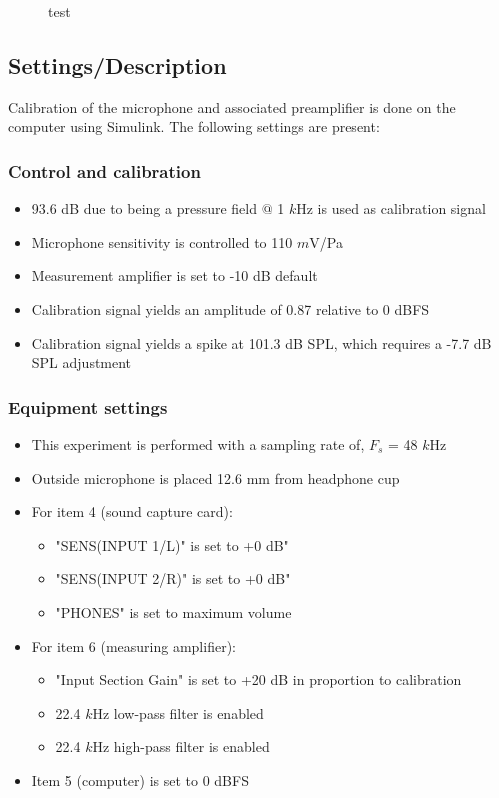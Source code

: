 \begin{figure}[H]
	\centering
	
	\caption{test}
	\label{test}
\end{figure}

\subsection{Settings/Description}
\label{SettingsHeadPhones}
Calibration of the microphone and associated preamplifier is done on the computer using Simulink\textsuperscript{\textregistered}. The following settings are present:

\subsubsection{Control and calibration}
\begin{itemize}

	\item 93.6 dB due to being a pressure field $@$ 1 $k$Hz is used as calibration signal
	\item Microphone sensitivity is controlled to 110 $m$V/Pa
	\item Measurement amplifier is set to -10 dB default
	\item Calibration signal yields an amplitude of 0.87 relative to 0 dBFS
	\item  Calibration signal yields a spike at 101.3 dB SPL, which requires a -7.7 dB SPL adjustment
\end{itemize}
\subsubsection{Equipment settings}
\begin{itemize}
	\item This experiment is performed with a sampling rate of, $F_{s}$ = 48 $k$Hz
	\item Outside microphone is placed 12.6 mm from headphone cup
	\item For item 4 (sound capture card):
	\begin{itemize}
		\item "SENS(INPUT 1/L)" is set to +0 dB"
		\item "SENS(INPUT 2/R)" is set to +0 dB"
		\item "PHONES" is set to maximum volume
	\end{itemize}		
	\item For item 6 (measuring amplifier):
		\begin{itemize}
			\item "Input Section Gain" is set to +20 dB in proportion to calibration
			\item 22.4 $k$Hz low-pass filter is enabled
			\item 22.4 $k$Hz high-pass filter is enabled 
		\end{itemize}
	\item Item 5 (computer) is set to 0 dBFS
\end{itemize}




